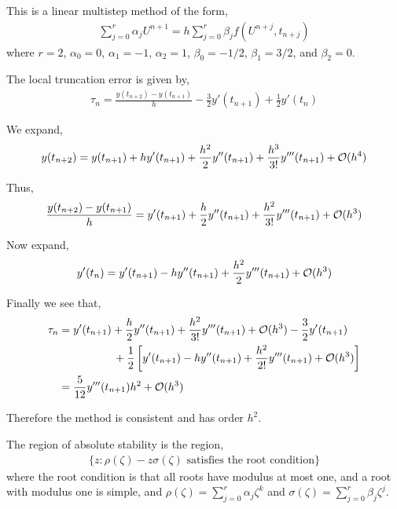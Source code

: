 \documentclass[10pt]{article}
\begin{document}
\begin{solution}[Solution]
This is a linear multistep method of the form,
\begin{align*}
    \sum_{j=0}^{r} \alpha_{j} U^{n+1} = h\sum_{j=0}^{r} \beta_j f(U^{n+j},t_{n+j})
\end{align*}
where \( r = 2 \), \( \alpha_0 = 0 \), \( \alpha_1 = -1 \), \( \alpha_2 = 1 \), \( \beta_0 = -1/2 \), \( \beta_1 = 3/2 \), and \( \beta_2 = 0 \).

The local truncation error is given by,
\begin{align*}
    \tau_n = \frac{y(t_{n+2}) - y(t_{n+1})}{h} - \frac{3}{2} y'(t_{n+1}) + \frac{1}{2} y' (t_n)
\end{align*}

We expand,
\begin{align*}
    y(t_{n+2}) = y(t_{n+1}) + h y'(t_{n+1}) + \frac{h^2}{2} y''(t_{n+1}) + \frac{h^3}{3!} y'''(t_{n+1}) + \mathcal{O}(h^4)
\end{align*}

Thus,
\begin{align*}
    \frac{y(t_{n+2})-y(t_{n+1})}{h} = y'(t_{n+1}) + \frac{h}{2} y''(t_{n+1}) + \frac{h^2}{3!} y'''(t_{n+1}) +\mathcal{O}(h^3)
\end{align*}

Now expand,
\begin{align*}
    y'(t_{n}) = y'(t_{n+1}) - h y''(t_{n+1}) + \frac{h^2}{2} y'''(t_{n+1}) + \mathcal{O}(h^3)
\end{align*}

Finally we see that,
\begin{align*}
    \tau_n &= y'(t_{n+1}) + \frac{h}{2} y''(t_{n+1}) + \frac{h^2}{3!} y'''(t_{n+1}) + \mathcal{O}(h^3) - \frac{3}{2} y'(t_{n+1}) \\
    &\hspace{5em} + \frac{1}{2} \left[ y'(t_{n+1})-h y''(t_{n+1}) + \frac{h^2}{2!}y'''(t_{n+1}) +\mathcal{O}(h^3) \right] \\
    &= \frac{5}{12} y'''(t_{n+1}) h^2 + \mathcal{O}(h^3)
\end{align*}

Therefore the method is consistent and has order \( h^2 \).

The region of absolute stability is the region,
\begin{align*}
    \{ z : \rho(\zeta) - z\sigma(\zeta) \text{ satisfies the root condition} \}
\end{align*}
    where the root condition is that all roots have modulus at most one, and a root with modulus one is simple, and \( \rho(\zeta) = \sum_{j=0}^{r} \alpha_j\zeta^k \) and \( \sigma(\zeta) = \sum_{j=0}^{r} \beta_j \zeta^j \).


\end{solution}
\end{document}
